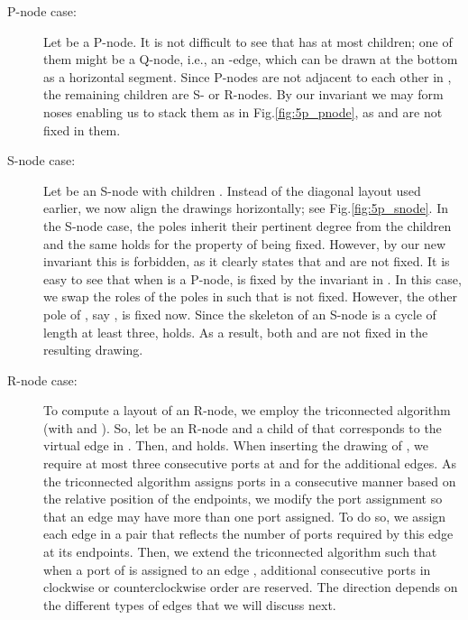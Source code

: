 \documentclass[a4paper,twoside,11pt]{article}
\begin{document}
\begin{description}
\item[P-node case:] Let  be a P-node. It is not difficult to see
that  has at most  children; one of them might be a Q-node,
i.e., an -edge, which can be drawn at the bottom as a
horizontal segment. Since P-nodes are not adjacent to each other in
, the remaining children are S- or R-nodes. By our
invariant we may form noses enabling us to stack them as in
Fig.\ref{fig:5p_pnode}, as  and  are not fixed in them.
\item[S-node case:] Let  be an S-node with children . Instead of the diagonal layout used earlier, we now
align the drawings horizontally; see Fig.\ref{fig:5p_snode}. In the
S-node case, the poles inherit their pertinent degree from the
children and the same holds for the property of being fixed.
However, by our new invariant this is forbidden, as it clearly
states that  and  are not fixed. It is easy to see that when
 is a P-node,  is fixed by the invariant in . In
this case, we swap the roles of the poles in  such that 
is not fixed. However, the other pole of , say , is
fixed now. Since the skeleton of an S-node is a cycle of length at
least three,  holds. As a result, both  and  are
not fixed in the resulting drawing.
\item[R-node case:] To compute a layout of an R-node, we employ the
triconnected algorithm (with  and ). So, let 
be an R-node and  a child of  that corresponds to
the virtual edge  in . Then,  and  holds. When inserting the
drawing of , we require at most three consecutive
ports at  and  for the additional edges. As the triconnected
algorithm assigns ports in a consecutive manner based on the
relative position of the endpoints, we modify the port assignment so
that an edge may have more than one port assigned. To do so, we
assign each edge  in  a pair
 that
reflects the number of ports required by this edge at its endpoints.
Then, we extend the triconnected algorithm such that when a port of
 is assigned to an edge , 
additional consecutive ports in clockwise or counterclockwise order
are reserved. The direction depends on the different types of edges
that we will discuss next.


\end{description}
\end{document}
